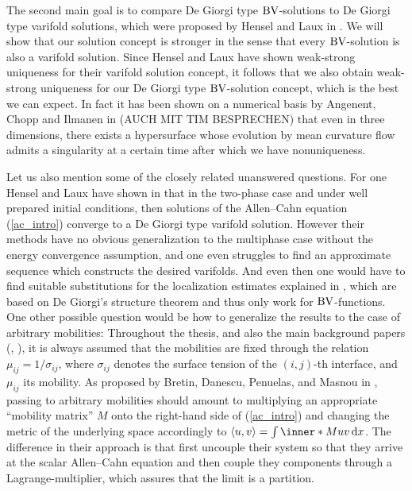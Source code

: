 The second main goal is to compare De Giorgi type $ \operatorname{BV} $-solutions to De 
Giorgi type varifold solutions, which were 
proposed by Hensel and Laux in 
\cite{hensel_laux_varifold_solution_concept_for_mean_curvature_flow}. We will 
show that our solution concept is stronger in the sense that every $ \operatorname{BV} 
$-solution is also a varifold solution. Since Hensel and Laux have shown 
weak-strong uniqueness for their varifold solution concept, it follows that we 
also obtain weak-strong uniqueness for our De Giorgi type $ \operatorname{BV} $-solution 
concept, which is the best we can expect. In fact it has been shown on a 
numerical basis by Angenent, Chopp and Ilmanen in 
\cite{angenent_chopp_ilmanen_a_computed_example_of_nonuniqueness_of_mcf}
(AUCH MIT TIM BESPRECHEN)
that even in three dimensions, there exists a hypersurface whose evolution by 
mean curvature 
flow admits a singularity at a certain time after which we have nonuniqueness.

Let us also mention some of the closely related unanswered questions. For one 
Hensel and Laux have shown in 
\cite{hensel_laux_varifold_solution_concept_for_mean_curvature_flow}
that in the two-phase case and under well prepared initial conditions, then 
solutions of the Allen--Cahn equation (\ref{ac_intro}) converge to a De Giorgi 
type varifold solution. However their methods have no obvious generalization to 
the multiphase case without the energy convergence assumption, and one even 
struggles to find an approximate sequence 
which constructs the desired varifolds. And even then one would have to find 
suitable substitutions for the localization estimates explained in 
, which are based on De Giorgi's structure 
theorem and thus only work for $ \operatorname{BV} $-functions.
One other possible question would be how to generalize the results to the case 
of 
arbitrary mobilities: Throughout the thesis, and also the main background 
papers 
(\cite{convergence_of_allen_cahn_equation_to_multiphase_mean_curvature_flow},
\cite{hensel_laux_varifold_solution_concept_for_mean_curvature_flow}), it is 
always assumed that the mobilities are fixed through the relation $ \mu_{ i j } 
= 1/ \sigma_{ i j } $, where $ \sigma_{ i j } $ denotes the surface tension of 
the $ ( i , j ) $-th interface, and $ \mu_{ i j } $ its mobility. As proposed by
Bretin, Danescu, Penuelas, and Masnou in 
\cite{bretin_dansecu_penuelas_masnou_a_metric_based_approach_to_mmcf_with_mobilities},
passing
to arbitrary mobilities should 
amount to multiplying an appropriate \enquote{mobility matrix} $ M $ onto the 
right-hand side of (\ref{ac_intro}) and changing the metric of the underlying 
space accordingly to $ \langle u , v \rangle = \int \inner*{M u}{ v} \dd{ x } $.
The difference in their approach is that first uncouple their system so that 
they arrive at the scalar Allen--Cahn equation and then couple they components 
through a Lagrange-multiplier, which assures that the limit is a partition.

